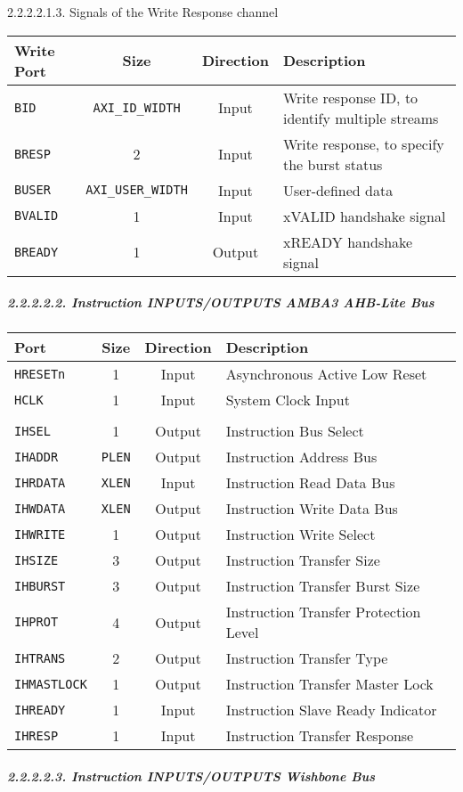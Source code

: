 \documentclass[]{article}
\let\oldsubparagraph\subparagraph
\renewcommand{\subparagraph}[1]{\oldsubparagraph{#1}\mbox{}}
\begin{document}
2.2.2.2.1.3. Signals of the Write Response channel

\begin{longtable}[]{@{}lccl@{}}
\toprule
Write Port & Size & Direction & Description\tabularnewline
\midrule
\endhead
\texttt{BID} & \texttt{AXI\_ID\_WIDTH} & Input & Write response ID, to
identify multiple streams\tabularnewline
\texttt{BRESP} & 2 & Input & Write response, to specify the burst
status\tabularnewline
\texttt{BUSER} & \texttt{AXI\_USER\_WIDTH} & Input & User-defined
data\tabularnewline
\texttt{BVALID} & 1 & Input & xVALID handshake signal\tabularnewline
\texttt{BREADY} & 1 & Output & xREADY handshake signal\tabularnewline
\bottomrule
\end{longtable}

\subparagraph{2.2.2.2.2. Instruction INPUTS/OUTPUTS AMBA3 AHB-Lite
Bus}\label{instruction-inputsoutputs-amba3-ahb-lite-bus}

\begin{longtable}[]{@{}lccl@{}}
\toprule
Port & Size & Direction & Description\tabularnewline
\midrule
\endhead
\texttt{HRESETn} & 1 & Input & Asynchronous Active Low
Reset\tabularnewline
\texttt{HCLK} & 1 & Input & System Clock Input\tabularnewline
& & &\tabularnewline
\texttt{IHSEL} & 1 & Output & Instruction Bus Select\tabularnewline
\texttt{IHADDR} & \texttt{PLEN} & Output & Instruction Address
Bus\tabularnewline
\texttt{IHRDATA} & \texttt{XLEN} & Input & Instruction Read Data
Bus\tabularnewline
\texttt{IHWDATA} & \texttt{XLEN} & Output & Instruction Write Data
Bus\tabularnewline
\texttt{IHWRITE} & 1 & Output & Instruction Write Select\tabularnewline
\texttt{IHSIZE} & 3 & Output & Instruction Transfer Size\tabularnewline
\texttt{IHBURST} & 3 & Output & Instruction Transfer Burst
Size\tabularnewline
\texttt{IHPROT} & 4 & Output & Instruction Transfer Protection
Level\tabularnewline
\texttt{IHTRANS} & 2 & Output & Instruction Transfer Type\tabularnewline
\texttt{IHMASTLOCK} & 1 & Output & Instruction Transfer Master
Lock\tabularnewline
\texttt{IHREADY} & 1 & Input & Instruction Slave Ready
Indicator\tabularnewline
\texttt{IHRESP} & 1 & Input & Instruction Transfer
Response\tabularnewline
\bottomrule
\end{longtable}

\subparagraph{2.2.2.2.3. Instruction INPUTS/OUTPUTS Wishbone
Bus}\label{instruction-inputsoutputs-wishbone-bus}
\end{document}
